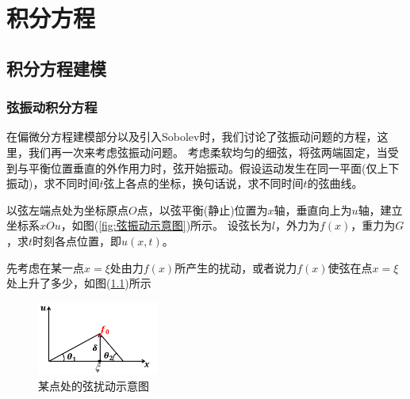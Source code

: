 % 
\chapter{积分方程}
\section{积分方程建模}
	\label{sec:积分方程建模}
	\subsection{弦振动积分方程}
		\label{subsec:弦振动积分方程}
		\par
		在偏微分方程建模部分以及引入Sobolev时，我们讨论了弦振动问题的方程，这里，我们再一次来考虑弦振动问题。
		考虑柔软均匀的细弦，将弦两端固定，当受到与平衡位置垂直的外作用力时，弦开始振动。假设运动发生在同一平面(仅上下振动)，求不同时间$t$弦上各点的坐标，换句话说，求不同时间$t$的弦曲线。
        \par
        以弦左端点处为坐标原点$O$点，以弦平衡(静止)位置为$x$轴，垂直向上为$u$轴，建立坐标系$xOu$，如图(\ref{fig:弦振动示意图})所示。
        设弦长为$l$，外力为$f(x)$，重力为$G$，求$t$时刻各点位置，即$u(x,t)$。
        \par
        先考虑在某一点$x = \xi$处由力$f(x)$所产生的扰动，或者说力$f(x)$使弦在点$x = \xi$处上升了多少，如图(\ref{fig:某点处的弦扰动示意图})所示
        \begin{figure}[H]
		\centering
		\includegraphics[width=4cm]{images/string_fluctuate_somwhere.jpg}
		\caption{某点处的弦扰动示意图}
		\label{fig:某点处的弦扰动示意图}
		\end{figure}
